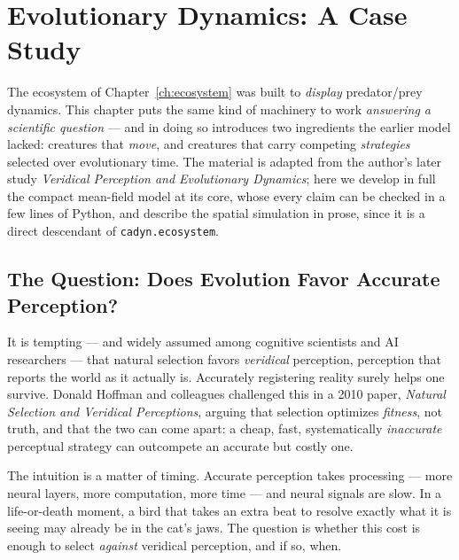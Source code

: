 \chapter{Evolutionary Dynamics: A Case Study}
\label{ch:evolution}

The ecosystem of Chapter~\ref{ch:ecosystem} was built to \emph{display}
predator/prey dynamics.  This chapter puts the same kind of machinery to
work \emph{answering a scientific question} --- and in doing so
introduces two ingredients the earlier model lacked: creatures that
\emph{move}, and creatures that carry competing \emph{strategies}
selected over evolutionary time.  The material is adapted from the
author's later study \emph{Veridical Perception and Evolutionary
Dynamics}; here we develop in full the compact mean-field model at its
core, whose every claim can be checked in a few lines of Python, and
describe the spatial simulation in prose, since it is a direct
descendant of \texttt{cadyn.ecosystem}.

\section{The Question: Does Evolution Favor Accurate Perception?}

It is tempting --- and widely assumed among cognitive scientists and AI
researchers --- that natural selection favors \emph{veridical}
perception, perception that reports the world as it actually is.
Accurately registering reality surely helps one survive.  Donald Hoffman
and colleagues challenged this in a 2010 paper, \emph{Natural Selection
and Veridical Perceptions}, arguing that selection optimizes
\emph{fitness}, not truth, and that the two can come apart: a cheap,
fast, systematically \emph{inaccurate} perceptual strategy can outcompete
an accurate but costly one.

The intuition is a matter of timing.  Accurate perception takes
processing --- more neural layers, more computation, more time --- and
neural signals are slow.  In a life-or-death moment, a bird that takes
an extra beat to resolve exactly what it is seeing may already be in the
cat's jaws.  The question is whether this cost is enough to select
\emph{against} veridical perception, and if so, when.


